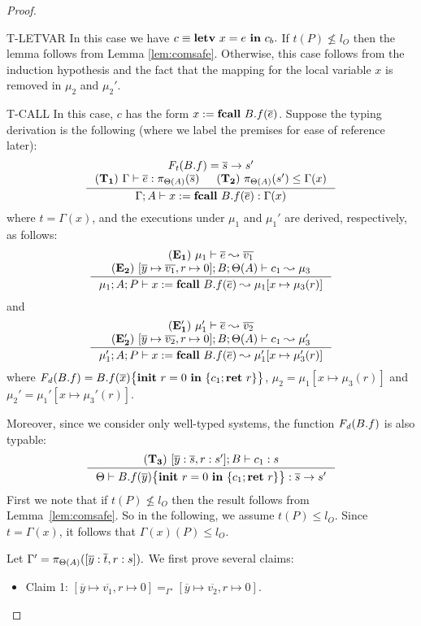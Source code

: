 {{{\begin{proof}
\begin{ProofEnumDesc}
\item[T-LETVAR]
  In this case we have $c\equiv\lcLETVAR{x}{e}{c_b}.$
  If $t(P) \nleq l_O$ then the lemma follows from Lemma \ref{lem:comsafe}.
  Otherwise, this case follows from the induction hypothesis and the fact
  that the mapping for the local variable $x$ is removed
  in $\mu_2$ and $\mu_2'.$
\item[T-CALL]
In this case, $c$ has the form
$\lcCALL{x}{B.f}{\overline{e}}$. Suppose the typing
derivation is the following (where we label the premises
for ease of reference later):
$$
\inference
{
\FT(B.f) = \overline{s} \rightarrow s' \\
(\mathbf{T_1}) ~ \Gamma \vdash \overline{e} : \app{\overline{s}}{\Theta(A)} &
(\mathbf{T_2}) ~ \app{s'}{\Theta(A)} \leq \Gamma(x)}
{\Gamma; A \vdash \lcCALL{x}{B.f}{\overline{e}} :
 \Gamma(x)  }
$$
where $t = \Gamma(x)$,
and the executions under $\mu_1$ and $\mu_1'$ are
derived, respectively, as follows:
$$
\inference{
(\mathbf{E_1}) ~ \mu_1\vdash\overline{e} \leadsto \overline{v_1} \\
(\mathbf{E_2}) ~ [\overline{y} \mapsto \overline{v_1}, r \mapsto 0] ; B;
  \Theta(A) \vdash c_1 \leadsto \mu_3
}
{\mu_1; A; P \vdash \lcCALL{x}{B.f}{\overline{e}} \leadsto
              \mu_1 [x \mapsto \mu_3(r) ]}
$$
and
$$
\inference{
(\mathbf{E_1'}) ~ \mu_1'\vdash\overline{e} \leadsto \overline{v_2}
\\
(\mathbf{E_2'}) ~ [\overline{y} \mapsto \overline{v_2}, r \mapsto 0] ; B;
\Theta(A) \vdash c_1 \leadsto \mu_3'}
{\mu_1';A;P \vdash \lcCALL{x}{B.f}{\overline{e}} \leadsto
              \mu_1' [x \mapsto \mu_3'(r) ]}
$$
where
$\FD(B.f) = \lpFUN{B.f}{\overline{x}}{c_1}$,
$\mu_2 = \mu_1[x \mapsto \mu_3(r)]$
and $\mu_2' = \mu_1'[x \mapsto \mu_3'(r)].$

Moreover, since we consider only well-typed systems,
the function $\FD(B.f)$ is also typable:
$$
\inference
    {
      (\mathbf{T_3}) ~ [\overline{y}:\overline{s}, r : s']; B\vdash c_1 : s
    }
    {
      \Theta \vdash \lpFUN{B.f}{\overline{y}}{c_1} :
      \overline{s}\rightarrow s'
    }
$$
First we note that if $t(P) \nleq l_O$ then the result
follows from Lemma~\ref{lem:comsafe}.
So in the following, we assume $t(P) \leq l_O$.
Since $t = \Gamma(x)$, it follows that
$\Gamma(x)(P) \leq l_O.$

Let $\Gamma' = \app{[\overline{y} : \overline{t}, r : s]}{\Theta(A)}.$
We first prove several claims:
\begin{itemize}
\item Claim 1:
$[\overline{y} \mapsto \overline{v_1}, r \mapsto 0]
=_{\Gamma'} [\overline{y} \mapsto \overline{v_2}, r\mapsto 0].$


\end{itemize}
\end{ProofEnumDesc}
\end{proof}}}}

